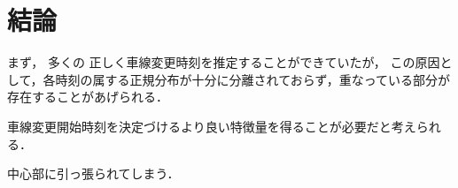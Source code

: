 \chapter{結論}
まず，
多くの
正しく車線変更時刻を推定することができていたが，
この原因として，各時刻の属する正規分布が十分に分離されておらず，重なっている部分が存在することがあげられる．

車線変更開始時刻を決定づけるより良い特徴量を得ることが必要だと考えられる．


中心部に引っ張られてしまう．
